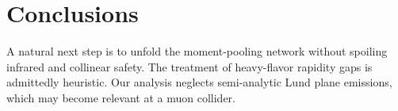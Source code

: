 \section{Conclusions}\label{sec:conclusions}

A natural next step is to unfold the moment-pooling network without
spoiling infrared and collinear safety. The treatment of heavy-flavor
rapidity gaps is admittedly heuristic. Our analysis neglects
semi-analytic Lund plane emissions, which may become relevant at a muon
collider.

